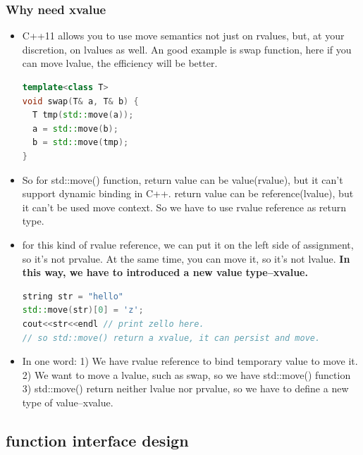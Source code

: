 \documentclass[a4paper,12pt,twoside]{book}
\begin{document}
\subsubsection{Why need xvalue}
\begin{itemize}
\item C++11 allows you to use move semantics not just on rvalues, but, at your discretion, on lvalues as well. An good example is swap function, here if you can move lvalue, the efficiency will be better. 
\begin{lstlisting}[frame=single, language=c++, mathescape=true]
template<class T> 
void swap(T& a, T& b) { 
  T tmp(std::move(a));
  a = std::move(b); 
  b = std::move(tmp);
} 
\end{lstlisting}

\item So for std::move() function, return value can be value(rvalue), but it can't support dynamic binding in C++.  return value can be reference(lvalue), but it can't be used move context. So we have to use rvalue reference as return type. 

\item for this kind of rvalue reference, we can put it on the left side of assignment, so it's not prvalue. At the same time, you can move it, so it's not lvalue.  \textbf{In this way, we have to introduced a new value type--xvalue.}    
\begin{lstlisting}[frame=single, language=c++, mathescape=true]
string str = "hello"
std::move(str)[0] = 'z';
cout<<str<<endl // print zello here.
// so std::move() return a xvalue, it can persist and move.
\end{lstlisting}

\item In one word: 1) We have rvalue reference to bind temporary value to move it. 2) We want to move a lvalue, such as swap, so we have std::move() function 3) std::move() return neither lvalue nor prvalue, so we have to define a new type of value--xvalue. 
\end{itemize}


\subsection{function interface design}
\end{document}
